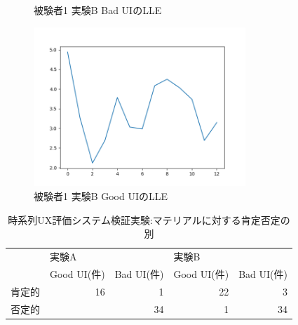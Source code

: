 \begin{figure}[htbp]
\begin{minipage}{0.5\hsize}
\begin{center}
    \end{center}
    \caption{被験者1 実験B Bad UIのLLE}
    \label{fig:lleb1}
  \end{minipage}
    \begin{minipage}{0.5\hsize}
    \begin{center}
       \includegraphics[width=80mm]{img/lle/1B-2.png}
    \end{center}
    \caption{被験者1 実験B Good UIのLLE}
    \label{fig:lleb2}
  \end{minipage}
\end{figure}

\begin{table}[htbp]
\centering
\begin{tabular}{llrlr}
\hline
    & \multicolumn{2}{l}{実験A}                             & \multicolumn{2}{l}{実験B}                             \\ \cline{2-5} 
    & Good UI(件)                & \multicolumn{1}{l}{Bad UI(件)} & Good UI(件)                & \multicolumn{1}{l}{Bad UI(件)} \\ \hline
肯定的 & \multicolumn{1}{r}{16} & 1                          & \multicolumn{1}{r}{22} & 3                          \\
否定的 & \multicolumn{1}{r}{}   & 34                         & \multicolumn{1}{r}{1}  & 34                         \\ \hline
\end{tabular}
\caption{時系列UX評価システム検証実験:マテリアルに対する肯定否定の別}
\label{table:negaposi}
\end{table}

